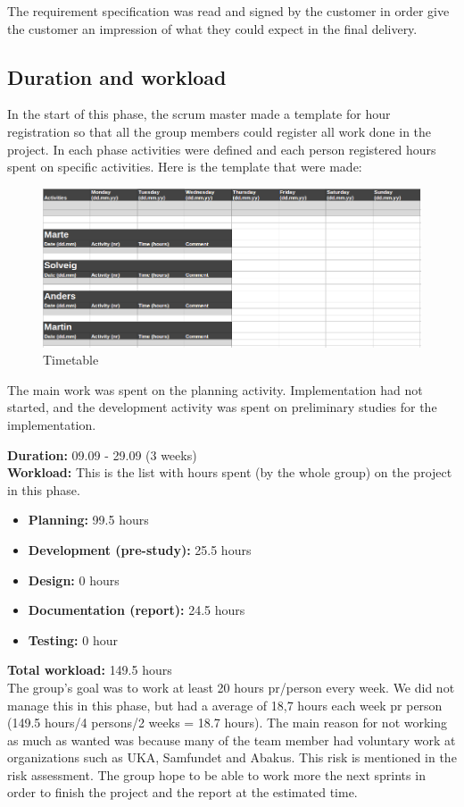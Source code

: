 	The requirement specification was read and signed by the customer in order give the customer 
	an impression of what they could expect in the final delivery.

\subsection{Duration and workload}
	In the start of this phase, the scrum master made a template for hour registration so that all the group members
	could register all work done in the project. In each phase activities were defined and each
	person registered hours spent on specific activities. Here is the template 
	that were made:

	\begin{figure}
		\includegraphics[width=\textwidth]{pictures/timetable.png}
		\caption{Timetable}
	\end{figure}

	The main work was spent on the planning activity. Implementation had not started, and 
	the development activity was spent on preliminary studies for the implementation.

		{\bf Duration:} 09.09 - 29.09 (3 weeks)\\
		{\bf Workload:} This is the list with hours spent (by the whole group) on the project in this phase.
			\begin{itemize}
				\item {\bf Planning:} 99.5 hours
				\item {\bf Development (pre-study):} 25.5 hours
				\item {\bf Design:} 0 hours
				\item {\bf Documentation (report):} 24.5 hours
				\item {\bf Testing:} 0 hour
			\end{itemize}
		{\bf Total workload: } 149.5 hours \\
	The group's goal was to work at least 20 hours pr/person every week. We did not manage this in this phase, but had a average of 18,7 hours each week pr person (149.5 hours/4 persons/2 weeks = 18.7 hours). 
	The main reason for not working as much as wanted was because many of the team member had voluntary
	work at organizations such as UKA, Samfundet and Abakus. This risk is mentioned in the risk assessment. The group 
	hope to be able to work more the next sprints in order to finish the project and the report at the estimated
	time. 

